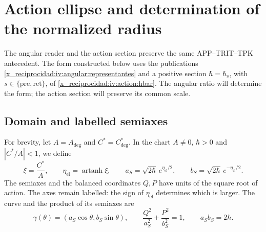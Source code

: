 \section{Action ellipse and determination of the normalized radius}
\label{x_reciprocidad:iv:ellipse:section}

The angular reader and the action section preserve the same
APP--TRIT--TPK antecedent. The form constructed
below uses the publications
\eqref{x_reciprocidad:iv:angular:representantes} and a positive section
\(\hbar=\hbar_s\), with
\(s\in\{\mathrm{pre},\mathrm{ret}\}\), of
\eqref{x_reciprocidad:iv:action:hbar}. The angular ratio will determine the form;
the action section will preserve its common scale.

\subsection{Domain and labelled semiaxes}
\label{x_reciprocidad:iv:ellipse:dominio}

For brevity, let \(A=A_{\deg}\) and \(C^*=C^*_{\deg}\).
In the chart \(A\ne0\), \(\hbar>0\) and \(|C^*/A|<1\),
we define
\begin{equation}
 \xi=\frac{C^*}{A},\qquad
 \eta_{\mathrm{el}}=\operatorname{artanh}\xi,\qquad
 a_S=\sqrt{2\hbar}\,e^{\eta_{\mathrm{el}}/2},\qquad
 b_S=\sqrt{2\hbar}\,e^{-\eta_{\mathrm{el}}/2}.
 \label{x_reciprocidad:iv:ellipse:semiejes}
\end{equation}
The semiaxes and the balanced coordinates \(Q,P\) have
units of the square root of action. The axes remain labelled:
the sign of \(\eta_{\mathrm{el}}\) determines which is
larger. The curve and the product of its semiaxes are
\begin{equation}
 \gamma(\theta)=(a_S\cos\theta,b_S\sin\theta),\qquad
 \frac{Q^2}{a_S^2}+\frac{P^2}{b_S^2}=1,\qquad
 a_Sb_S=2\hbar.
 \label{x_reciprocidad:iv:ellipse:curva}
\end{equation}

